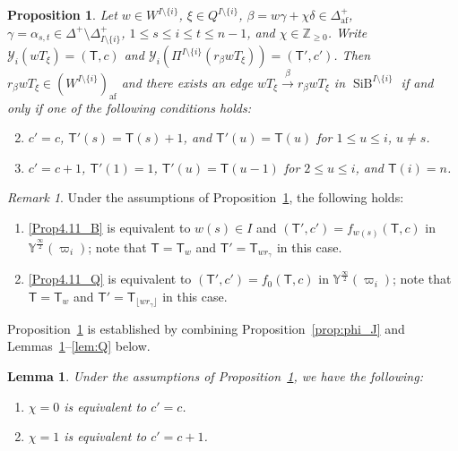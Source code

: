 \documentclass[10pt]{amsart}
\newtheorem{prop}[theo]{Proposition}
\newtheorem{lemm}[theo]{Lemma}
\theoremstyle{definition}\newtheorem{defi}[theo]{Definition}
\theoremstyle{remark}\newtheorem{rema}[theo]{Remark}
\newcommand{\BZ}{\mathbb{Z}}
\newcommand{\si}{\frac{\infty}{2}}
\DeclareMathOperator{\af}{af}
\DeclareMathOperator{\SiB}{SiB}
\begin{document}
\begin{prop} \label{prop:tab-cri}
Let 
$w \in W^{I \setminus \{ i \}}$, 
$\xi \in Q^{I \setminus \{ i \}}$, 
$\beta = w\gamma + \chi \delta \in \Delta_{\af}^+$, 
$\gamma = \alpha_{s,t} \in \Delta^+ \setminus \Delta_{I \setminus \{ i \}}^+$, 
$1 \leq s \leq i \leq t \leq n-1$, and
$\chi \in \BZ_{\geq 0}$. 
Write 
$\mathcal{Y}_i (wT_{\xi}) = (\mathsf{T},c)$
and 
$\mathcal{Y}_i \left( \Pi^{I \setminus \{ i \}}(r_{\beta}wT_{\xi}) \right) = (\mathsf{T}',c')$. 
Then 
$r_{\beta}wT_{\xi} \in (W^{I \setminus \{ i \}})_{\af}$
and 
there exists an edge 
$wT_{\xi} \xrightarrow{\ \beta \ } r_{\beta}wT_{\xi}$
in 
$\SiB ^{I \setminus \{ i \}}$
if and only if one of the following conditions holds:
\begin{enumerate}[label=(\Alph*)]\setcounter{enumi}{1}
\item\label{Prop4.11_B} %
$c' = c$, 
$\mathsf{T}'(s) = \mathsf{T}(s) + 1$, 
and 
$\mathsf{T}'(u) = \mathsf{T}(u)$ 
for $1 \leq u \leq i$, $u \neq s$.\setcounter{enumi}{16} 
\item\label{Prop4.11_Q} %
$c' = c + 1$, 
$\mathsf{T}'(1) = 1$, 
$\mathsf{T}'(u) = \mathsf{T}(u-1)$ for $2 \leq u \leq i$, 
and 
$\mathsf{T}(i) = n$.
\end{enumerate}
\end{prop}

\begin{rema}
Under the assumptions of Proposition~\ref{prop:tab-cri}, 
the following holds: 
\begin{enumerate}[label=(\arabic*)]
\item\label{Rema4.12_1}
\ref{Prop4.11_B} is equivalent to 
$w(s) \in I$ 
and 
$(\mathsf{T}', c') = f_{w(s)}(\mathsf{T} , c)$
in 
$\mathbb{Y}^{\si}(\varpi_i)$; 
note that 
$\mathsf{T} = \mathsf{T}_w$ 
and 
$\mathsf{T}' = \mathsf{T}_{w r_{\gamma}}$ 
in this case. 
\item\label{Rema4.12_2}
\ref{Prop4.11_Q} is equivalent to 
$(\mathsf{T}', c') = f_0(\mathsf{T} , c)$
in 
$\mathbb{Y}^{\si}(\varpi_i)$; 
note that 
$\mathsf{T} = \mathsf{T}_w$ 
and 
$\mathsf{T}' = \mathsf{T}_{\lfloor w r_{\gamma} \rfloor}$ 
in this case. 
\end{enumerate}
\end{rema}

Proposition~\ref{prop:tab-cri} is established by combining 
Proposition~\ref{prop:phi_J} and Lemmas~\ref{lem:c'=c+chi}--\ref{lem:Q} below.

\begin{lemm} \label{lem:c'=c+chi}
Under the assumptions of Proposition~\ref{prop:tab-cri}, 
we have the following:
\begin{enumerate}[label=(\arabic*)]
\item \label{Lemm_4.13_1}
$\chi = 0$
is equivalent to 
$c' = c$. 
\item\label{Lemm_4.13_2}
$\chi = 1$
is equivalent to 
$c' = c+1$. 
\end{enumerate}
\end{lemm}
\end{document}
